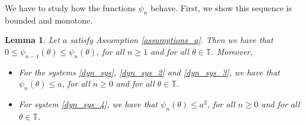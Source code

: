 \documentclass[12pt]{article}
\newcommand{\T}{\mathbb{T}}
\theoremstyle{plain}
\newtheorem{lemma}[defn]{Lemma}
\theoremstyle{remark}
\theoremstyle{definition}
\begin{document}
We have to study how the functions $\psi_n$ behave. First, we show this sequence is bounded and monotone.
\begin{lemma}\label{integ_psy}
    Let $a$ satisfy Assumption \eqref{assumptions_a}. Then we have that $0\leq \psi_{n-1}(\theta)\leq \psi_{n}(\theta)$, for all $n\geq1$ and for all $\theta\in\T$. Moreover,
    \begin{itemize}
        \item For the systems \eqref{dyn_sys}, \eqref{dyn_sys_2} and \eqref{dyn_sys_3}, we have that $\psi_{n}(\theta)\leq a$, for all $n\geq0$ and for all $\theta\in\T$.
        \item For system \eqref{dyn_sys_4}, we have that $\psi_{n}(\theta)\leq a^2$, for all $n\geq0$ and for all $\theta\in\T$.
    \end{itemize}
\end{lemma}
\end{document}
